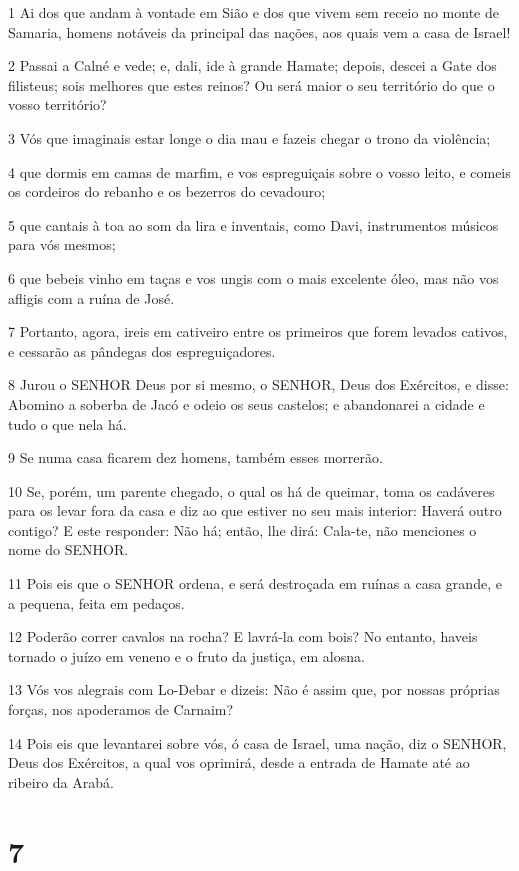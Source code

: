 \par 1 Ai dos que andam à vontade em Sião e dos que vivem sem receio no monte de Samaria, homens notáveis da principal das nações, aos quais vem a casa de Israel!
\par 2 Passai a Calné e vede; e, dali, ide à grande Hamate; depois, descei a Gate dos filisteus; sois melhores que estes reinos? Ou será maior o seu território do que o vosso território?
\par 3 Vós que imaginais estar longe o dia mau e fazeis chegar o trono da violência;
\par 4 que dormis em camas de marfim, e vos espreguiçais sobre o vosso leito, e comeis os cordeiros do rebanho e os bezerros do cevadouro;
\par 5 que cantais à toa ao som da lira e inventais, como Davi, instrumentos músicos para vós mesmos;
\par 6 que bebeis vinho em taças e vos ungis com o mais excelente óleo, mas não vos afligis com a ruína de José.
\par 7 Portanto, agora, ireis em cativeiro entre os primeiros que forem levados cativos, e cessarão as pândegas dos espreguiçadores.
\par 8 Jurou o SENHOR Deus por si mesmo, o SENHOR, Deus dos Exércitos, e disse: Abomino a soberba de Jacó e odeio os seus castelos; e abandonarei a cidade e tudo o que nela há.
\par 9 Se numa casa ficarem dez homens, também esses morrerão.
\par 10 Se, porém, um parente chegado, o qual os há de queimar, toma os cadáveres para os levar fora da casa e diz ao que estiver no seu mais interior: Haverá outro contigo? E este responder: Não há; então, lhe dirá: Cala-te, não menciones o nome do SENHOR.
\par 11 Pois eis que o SENHOR ordena, e será destroçada em ruínas a casa grande, e a pequena, feita em pedaços.
\par 12 Poderão correr cavalos na rocha? E lavrá-la com bois? No entanto, haveis tornado o juízo em veneno e o fruto da justiça, em alosna.
\par 13 Vós vos alegrais com Lo-Debar e dizeis: Não é assim que, por nossas próprias forças, nos apoderamos de Carnaim?
\par 14 Pois eis que levantarei sobre vós, ó casa de Israel, uma nação, diz o SENHOR, Deus dos Exércitos, a qual vos oprimirá, desde a entrada de Hamate até ao ribeiro da Arabá.

\chapter{7}

